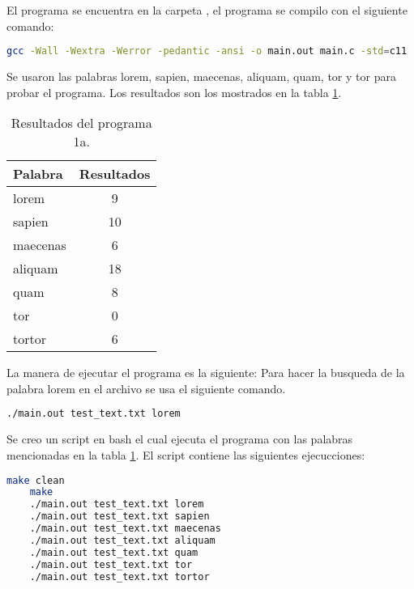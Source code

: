 El programa se encuentra en la carpeta , el programa se compilo con el siguiente comando:

\begin{lstlisting}[language=bash]
    gcc -Wall -Wextra -Werror -pedantic -ansi -o main.out main.c -std=c11
\end{lstlisting}

Se usaron las palabras lorem, sapien, maecenas, aliquam, quam, tor y tor para probar el programa. Los resultados son los mostrados en la tabla \ref{table:results_1a}.

\begin{table}[H]
    \centering
    \begin{tabular}{lc} \hline
        Palabra  & Resultados \\\hline
        lorem    & 9          \\
        sapien   & 10         \\
        maecenas & 6          \\
        aliquam  & 18         \\
        quam     & 8          \\
        tor      & 0          \\
        tortor   & 6          \\ \hline
    \end{tabular}
    \caption{Resultados del programa 1a.}
    \label{table:results_1a}
\end{table}

La manera de ejecutar el programa es la siguiente:
Para hacer la busqueda de la palabra lorem en el archivo  se usa el siguiente comando.

\begin{lstlisting}[language=bash]
    ./main.out test_text.txt lorem
\end{lstlisting}

Se creo un script en bash el cual ejecuta el programa con las palabras mencionadas en la tabla \ref{table:results_1a}. El script contiene las siguientes ejecucciones:

\begin{lstlisting}[language=bash]
    make clean
    make 
    ./main.out test_text.txt lorem
    ./main.out test_text.txt sapien
    ./main.out test_text.txt maecenas
    ./main.out test_text.txt aliquam
    ./main.out test_text.txt quam
    ./main.out test_text.txt tor
    ./main.out test_text.txt tortor
\end{lstlisting}